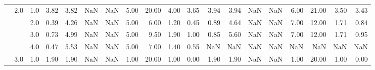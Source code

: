 \begin{tabular}{lllrrrrrrrrrrrrrrrr}
       & 2.0 & 1.0  &      3.82 &       3.82 &               NaN &                NaN & 5.00 &  20.00 &             4.00 &                         3.65 &      3.94 &       3.94 &               NaN &                NaN & 6.00 &  21.00 &             3.50 &                         3.43 \\
       &     & 2.0  &      0.39 &       4.26 &               NaN &                NaN & 5.00 &   6.00 &             1.20 &                         0.45 &      0.89 &       4.64 &               NaN &                NaN & 7.00 &  12.00 &             1.71 &                         0.84 \\
       &     & 3.0  &      0.73 &       4.99 &               NaN &                NaN & 5.00 &   9.50 &             1.90 &                         1.00 &      0.85 &       5.60 &               NaN &                NaN & 7.00 &  12.00 &             1.71 &                         0.95 \\
       &     & 4.0  &      0.47 &       5.53 &               NaN &                NaN & 5.00 &   7.00 &             1.40 &                         0.55 &       NaN &        NaN &               NaN &                NaN &  NaN &    NaN &              NaN &                          NaN \\
       & 3.0 & 1.0  &      1.90 &       1.90 &               NaN &                NaN & 1.00 &  20.00 &             1.00 &                         0.00 &      1.90 &       1.90 &               NaN &                NaN & 1.00 &  20.00 &             1.00 &                         0.00 \\
\bottomrule
\end{tabular}
